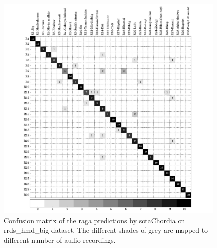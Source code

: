 \begin{figure}
	\begin{center}
		\includegraphics[width=\figSizeNinety]{ch07_ragaRecognition/figures/CM_pcd_hmd.pdf}
	\end{center}
	\caption[Confusion matrix of the classification results by \acrshort{sotaChordia} on \acrshort{rrds_hmd_big}]{Confusion matrix of the \gls{raga} predictions by \acrshort{sotaChordia} on \acrshort{rrds_hmd_big} dataset. The different shades of grey are mapped to different number of audio recordings.}
	\label{fig:confusion_matrix_hmd_chordia}
\end{figure}



